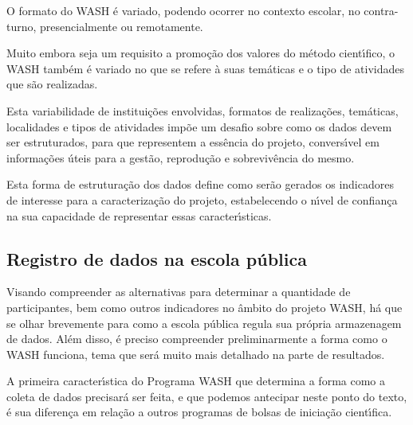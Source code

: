 \documentclass[
12pt,		%
openright,	%
twoside,  %
a4paper,			%
chapter=TITLE,		%
english,			%
french,				%
spanish,			%
brazil				%
]{USPSC-classe/USPSC_RedarTex}
\begin{document}
O formato do WASH \'e variado, podendo ocorrer no contexto escolar, no contra-turno, presencialmente ou remotamente.








Muito embora seja um requisito a promo\c{c}\~ao dos valores do m\'etodo cient\'{\i}fico, o WASH tamb\'em \'e variado no que se refere \`a suas tem\'aticas e o tipo de atividades que s\~ao realizadas.








Esta variabilidade de institui\c{c}\~oes envolvidas, formatos de realiza\c{c}\~oes, tem\'aticas, localidades e tipos de atividades imp\~oe um desafio sobre como os dados devem ser estruturados, para que representem a ess\^encia do projeto, convers\'{\i}vel em informa\c{c}\~oes \'uteis para a gest\~ao, reprodu\c{c}\~ao e sobreviv\^encia do mesmo.








Esta forma de estrutura\c{c}\~ao dos dados define como ser\~ao gerados os indicadores de interesse para a caracteriza\c{c}\~ao do projeto, estabelecendo o n\'{\i}vel de confian\c{c}a na sua capacidade de representar essas caracter\'{\i}sticas.








\subsection[Registro de dados na escola p\'ublica]{Registro de dados na escola p\'ublica}\label{Registro de dados na escola p\'ublica}
Visando compreender as alternativas para determinar a quantidade de participantes, bem como outros indicadores no \^ambito do projeto WASH, h\'a que se olhar brevemente para como a escola p\'ublica regula sua pr\'opria armazenagem de dados. Al\'em disso, \'e preciso compreender preliminarmente a forma como o WASH funciona, tema que ser\'a muito mais detalhado na parte de resultados.








A primeira caracter\'{\i}stica do Programa WASH que determina a forma como a coleta de dados precisar\'a ser feita, e que podemos antecipar neste ponto do texto, \'e sua diferen\c{c}a em rela\c{c}\~ao a outros programas de bolsas de inicia\c{c}\~ao cient\'{\i}fica.
\end{document}
